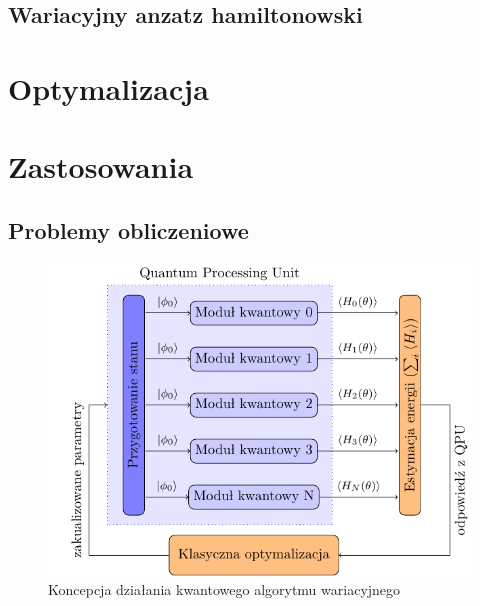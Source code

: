 \documentclass[a4paper,11pt
]{article}
\begin{document}
\subsection{Wariacyjny anzatz hamiltonowski}

\hypertarget{optymalizacja}{%
	\section{Optymalizacja}\label{optymalizacja}}

\hypertarget{zastosowania}{%
	\section{Zastosowania}\label{zastosowania}}


\hypertarget{matematyczne}{%
	\subsection{Problemy obliczeniowe}\label{matematyczne}}


\begin{figure}
\centering
\includegraphics{vqe-pl.pdf}
\caption{Koncepcja działania kwantowego algorytmu wariacyjnego}
\end{figure}
\end{document}
